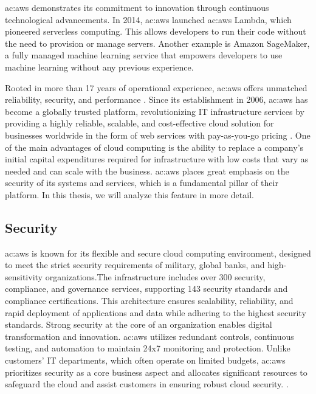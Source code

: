 \gls{ac:aws} demonstrates its commitment to innovation through continuous technological advancements. In 2014, \gls{ac:aws} launched \gls{ac:aws} Lambda, which pioneered serverless computing. This allows developers to run their code without the need to provision or manage servers. Another example is Amazon SageMaker, a fully managed machine learning service that empowers developers to use machine learning without any previous experience.

Rooted in more than 17 years of operational experience, \gls{ac:aws} offers unmatched reliability, security, and performance \cite{WhatIsAWS}. Since its establishment in 2006, \gls{ac:aws} has become a globally trusted platform, revolutionizing IT infrastructure services by providing a highly reliable, scalable, and cost-effective cloud solution for businesses worldwide in the form of web services with pay-as-you-go pricing \cite{AboutAWS}. One of the main advantages of cloud computing is the ability to replace a company's initial capital expenditures required for infrastructure with low costs that vary as needed and can scale with the business. \gls{ac:aws} places great emphasis on the security of its systems and services, which is a fundamental pillar of their platform. In this thesis, we will analyze this feature in more detail.

\subsection{Security}
\gls{ac:aws} is known for its flexible and secure cloud computing environment, designed to meet the strict security requirements of military, global banks, and high-sensitivity organizations.The infrastructure includes over 300 security, compliance, and governance services, supporting 143 security standards and compliance certifications. This architecture ensures scalability, reliability, and rapid deployment of applications and data while adhering to the highest security standards. Strong security at the core of an organization enables digital transformation and innovation. \gls{ac:aws} utilizes redundant controls, continuous testing, and automation to maintain 24x7 monitoring and protection. Unlike customers' IT departments, which often operate on limited budgets, \gls{ac:aws} prioritizes security as a core business aspect and allocates significant resources to safeguard the cloud and assist customers in ensuring robust cloud security. \cite{AWSCloudComputing}. 

